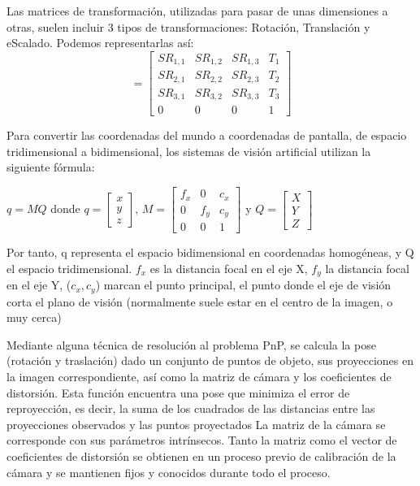 Las matrices de transformación, utilizadas para pasar de unas dimensiones a otras, suelen incluir 3 tipos de transformaciones: Rotación, Translación y eScalado. Podemos representarlas así:
\begin{equation}
  [R|t] = \begin{bmatrix} SR_{1,1} & SR_{1,2} & SR_{1,3} & T_{1}  \\
    SR_{2,1} & SR_{2,2} & SR_{2,3} & T_{2}  \\
    SR_{3,1} & SR_{3,2} & SR_{3,3} & T_{3}  \\
    0    &     0   &     0   &  1 
  \end{bmatrix}
\end{equation}

Para convertir las coordenadas del mundo a coordenadas de pantalla, de espacio tridimensional a bidimensional, los sistemas de visión artificial utilizan la siguiente fórmula:

\begin{center}
  $q=MQ$ donde $q=\begin{bmatrix} x \\ y \\ z \end{bmatrix}$, $M=\begin{bmatrix} f_{x} & 0 & c_{x} \\ 0 & f_{y} & c_{y} \\ 0 & 0 & 1 \end{bmatrix}$ y $Q=\begin{bmatrix} X \\ Y \\ Z \end{bmatrix}$
\end{center}

Por tanto, q representa el espacio bidimensional en coordenadas homogéneas, y Q el espacio tridimensional. $f_{x}$ es la distancia focal en el eje X, $f_{y}$ la distancia focal en el eje Y, ($c_{x},c_{y}$) marcan el punto principal, el punto donde el eje de visión corta el plano de visión (normalmente suele estar en el centro de la imagen, o muy cerca) 

Mediante alguna técnica de resolución al problema PnP, se calcula la pose (rotación y traslación) dado un conjunto de puntos de objeto, sus proyecciones en la imagen correspondiente, así como la matriz de cámara y los coeficientes de distorsión. Esta función encuentra una pose que minimiza el error de reproyección, es decir, la suma de los cuadrados de las distancias entre las proyecciones observados y las puntos proyectados
La matriz de la cámara se corresponde con sus parámetros intrínsecos. Tanto la matriz como el vector de coeficientes de distorsión se obtienen en un proceso previo de calibración de la cámara y se mantienen fijos y conocidos durante todo el proceso.


